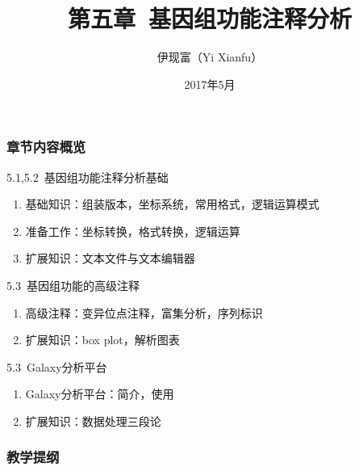 




\title[基因组功能注释分析]{第五章\ 基因组功能注释分析}
\author[Yixf]{伊现富（Yi Xianfu）}
\date{2017年5月}

\begin{frame}
  \titlepage
\end{frame}

\begin{frame}
  \frametitle{章节内容概览}
  \begin{block}{5.1,5.2\ 基因组功能注释分析基础}
    \begin{enumerate}
      \item 基础知识：组装版本，坐标系统，常用格式，逻辑运算模式
      \item 准备工作：坐标转换，格式转换，逻辑运算
      \item 扩展知识：文本文件与文本编辑器
    \end{enumerate}
  \end{block}
  \begin{block}{5.3\ 基因组功能的高级注释}
    \begin{enumerate}
      \item 高级注释：变异位点注释，富集分析，序列标识
      \item 扩展知识：box plot，解析图表
    \end{enumerate}
  \end{block}
  \begin{block}{5.3\ Galaxy分析平台}
    \begin{enumerate}
      \item Galaxy分析平台：简介，使用
      \item 扩展知识：数据处理三段论
    \end{enumerate}
  \end{block}
\end{frame}

\begin{frame}[plain]
  \frametitle{教学提纲}
  \setcounter{tocdepth}{2}
  \begin{multicols}{2}
  \tableofcontents
  \end{multicols}
\end{frame}









